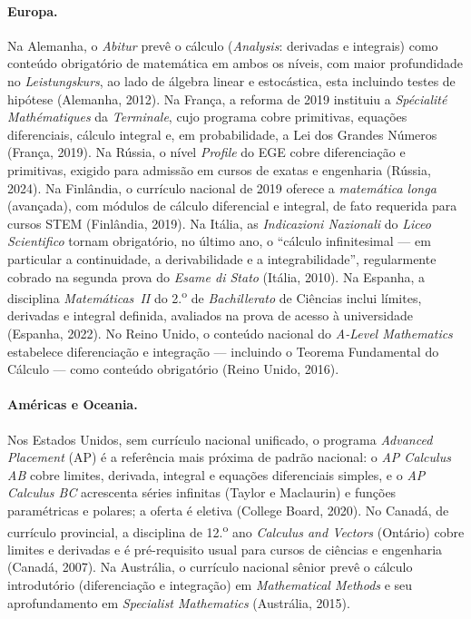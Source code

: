 \documentclass[12pt,a4paper,oneside]{article}
\begin{document}
\paragraph{Europa.} Na Alemanha, o \emph{Abitur} prevê o cálculo
(\emph{Analysis}: derivadas e integrais) como conteúdo obrigatório de
matemática em ambos os níveis, com maior profundidade no
\emph{Leistungskurs}, ao lado de álgebra linear e estocástica, esta
incluindo testes de hipótese (Alemanha, 2012). Na França, a reforma de
2019 instituiu a \emph{Spécialité Mathématiques} da \emph{Terminale}, cujo
programa cobre primitivas, equações diferenciais, cálculo integral e, em
probabilidade, a Lei dos Grandes Números (França, 2019). Na Rússia, o
nível \emph{Profile} do EGE cobre diferenciação e primitivas, exigido
para admissão em cursos de exatas e engenharia (Rússia, 2024). Na
Finlândia, o currículo nacional de 2019 oferece a \emph{matemática longa}
(avançada), com módulos de cálculo diferencial e integral, de fato
requerida para cursos STEM (Finlândia, 2019). Na Itália, as
\emph{Indicazioni Nazionali} do \emph{Liceo Scientifico} tornam
obrigatório, no último ano, o ``cálculo infinitesimal --- em particular a
continuidade, a derivabilidade e a integrabilidade'', regularmente
cobrado na segunda prova do \emph{Esame di Stato} (Itália, 2010). Na
Espanha, a disciplina \emph{Matemáticas~II} do 2.\textsuperscript{o} de
\emph{Bachillerato} de Ciências inclui límites, derivadas e integral
definida, avaliados na prova de acesso à universidade (Espanha, 2022). No
Reino Unido, o conteúdo nacional do \emph{A-Level Mathematics} estabelece
diferenciação e integração --- incluindo o Teorema Fundamental do Cálculo
--- como conteúdo obrigatório (Reino Unido, 2016).

\paragraph{Américas e Oceania.} Nos Estados Unidos, sem currículo
nacional unificado, o programa \emph{Advanced Placement} (AP) é a
referência mais próxima de padrão nacional: o \emph{AP Calculus AB} cobre
limites, derivada, integral e equações diferenciais simples, e o \emph{AP
Calculus BC} acrescenta séries infinitas (Taylor e Maclaurin) e funções
paramétricas e polares; a oferta é eletiva (College Board, 2020). No
Canadá, de currículo provincial, a disciplina de 12.\textsuperscript{o}
ano \emph{Calculus and Vectors} (Ontário) cobre limites e derivadas e é
pré-requisito usual para cursos de ciências e engenharia (Canadá, 2007).
Na Austrália, o currículo nacional sênior prevê o cálculo introdutório
(diferenciação e integração) em \emph{Mathematical Methods} e seu
aprofundamento em \emph{Specialist Mathematics} (Austrália, 2015).
\end{document}
